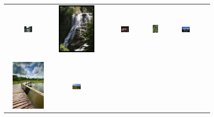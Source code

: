 \begin{figure}[th]
{\small{
\begin{center}
\begin{tabular}{@{}c@{\,\,\,}c@{\,\,\,}c@{\,\,\,}c@{\,\,\,}c@{\,\,\,}}
\includegraphics[width=0.19\textwidth]{imggrid/datasetposi/1.jpg} &
\includegraphics[height=1in]{imggrid/datasetposi/2.jpg} &
\includegraphics[width=0.19\textwidth]{imggrid/datasetposi/3.jpg} &
\includegraphics[height=1in]{imggrid/datasetposi/4.jpg} &
\includegraphics[width=0.19\textwidth]{imggrid/datasetposi/5.jpg} \\
\\[-6pt]
\hline
\\[-6pt]
\includegraphics[height=1in]{imggrid/datasetposi/6.jpg} &
\includegraphics[width=0.19\textwidth]{imggrid/datasetposi/7.jpg} &

\end{tabular}
\end{center}}}
\end{figure}
